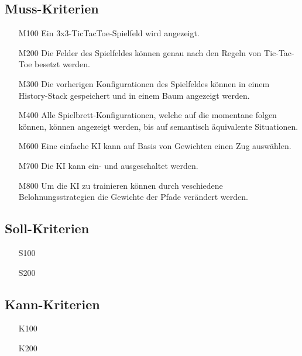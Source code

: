 \documentclass[titlepage]{scrartcl}
\begin{document}
\subsection{Muss-Kriterien}
	\begin{itemize}
		\item[M100] Ein 3x3-TicTacToe-Spielfeld wird angezeigt.
		\item[M200] Die Felder des Spielfeldes können genau nach den Regeln von Tic-Tac-Toe besetzt werden.
		\item[M300] Die vorherigen Konfigurationen des Spielfeldes können in einem History-Stack gespeichert und in einem Baum angezeigt werden.
		\item[M400] Alle Spielbrett-Konfigurationen, welche auf die momentane folgen können, können angezeigt werden, bis auf semantisch äquivalente Situationen.
		\item[M600] Eine einfache KI kann auf Basis von Gewichten einen Zug auswählen.
		\item[M700] Die KI kann ein- und ausgeschaltet werden.
		\item[M800] Um die KI zu trainieren können durch veschiedene Belohnungsstrategien die Gewichte der Pfade verändert werden.
	\end{itemize}
\subsection{Soll-Kriterien}
	\begin{itemize}
		\item[S100]
		\item[S200]
	\end{itemize}

\subsection{Kann-Kriterien}
	\begin{itemize}
		\item[K100]
		\item[K200]
	\end{itemize}
	
\end{document}
